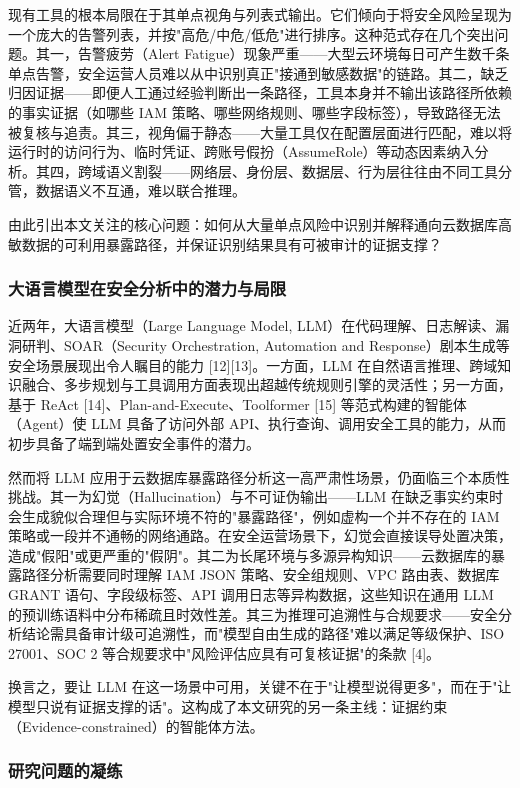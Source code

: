 \documentclass[a4paper,12pt]{ctexart}
\begin{document}
现有工具的根本局限在于其单点视角与列表式输出。它们倾向于将安全风险呈现为一个庞大的告警列表，并按"高危/中危/低危"进行排序。这种范式存在几个突出问题。其一，告警疲劳（Alert Fatigue）现象严重——大型云环境每日可产生数千条单点告警，安全运营人员难以从中识别真正"接通到敏感数据"的链路。其二，缺乏归因证据——即便人工通过经验判断出一条路径，工具本身并不输出该路径所依赖的事实证据（如哪些 IAM 策略、哪些网络规则、哪些字段标签），导致路径无法被复核与追责。其三，视角偏于静态——大量工具仅在配置层面进行匹配，难以将运行时的访问行为、临时凭证、跨账号假扮（AssumeRole）等动态因素纳入分析。其四，跨域语义割裂——网络层、身份层、数据层、行为层往往由不同工具分管，数据语义不互通，难以联合推理。

由此引出本文关注的核心问题：如何从大量单点风险中识别并解释通向云数据库高敏数据的可利用暴露路径，并保证识别结果具有可被审计的证据支撑？

\subsubsection{大语言模型在安全分析中的潜力与局限}

近两年，大语言模型（Large Language Model, LLM）在代码理解、日志解读、漏洞研判、SOAR（Security Orchestration, Automation and Response）剧本生成等安全场景展现出令人瞩目的能力 [12][13]。一方面，LLM 在自然语言推理、跨域知识融合、多步规划与工具调用方面表现出超越传统规则引擎的灵活性；另一方面，基于 ReAct [14]、Plan-and-Execute、Toolformer [15] 等范式构建的智能体（Agent）使 LLM 具备了访问外部 API、执行查询、调用安全工具的能力，从而初步具备了端到端处置安全事件的潜力。

然而将 LLM 应用于云数据库暴露路径分析这一高严肃性场景，仍面临三个本质性挑战。其一为幻觉（Hallucination）与不可证伪输出——LLM 在缺乏事实约束时会生成貌似合理但与实际环境不符的"暴露路径"，例如虚构一个并不存在的 IAM 策略或一段并不通畅的网络通路。在安全运营场景下，幻觉会直接误导处置决策，造成"假阳"或更严重的"假阴"。其二为长尾环境与多源异构知识——云数据库的暴露路径分析需要同时理解 IAM JSON 策略、安全组规则、VPC 路由表、数据库 GRANT 语句、字段级标签、API 调用日志等异构数据，这些知识在通用 LLM 的预训练语料中分布稀疏且时效性差。其三为推理可追溯性与合规要求——安全分析结论需具备审计级可追溯性，而"模型自由生成的路径"难以满足等级保护、ISO 27001、SOC 2 等合规要求中"风险评估应具有可复核证据"的条款 [4]。

换言之，要让 LLM 在这一场景中可用，关键不在于"让模型说得更多"，而在于"让模型只说有证据支撑的话"。这构成了本文研究的另一条主线：证据约束（Evidence-constrained）的智能体方法。

\subsubsection{研究问题的凝练}
\end{document}
